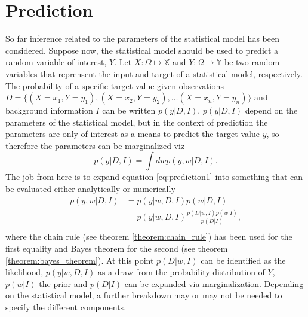 \section{Prediction}
So far inference related to the parameters of the statistical model has been considered. Suppose now, the statistical model should be used to predict a random variable of interest, $Y$. Let $X: \Omega \mapsto \mathbb{X}$ and $Y:\Omega \mapsto \mathbb{Y}$ be two random variables that reprensent the input and target of a statistical model, respectively. The probability of a specific target value given observations $D = \{(X=x_1, Y=y_1), (X=x_2, Y=y_2),\dots (X=x_n, Y=y_n)\}$ and background information $I$ can be written $p(y|D,I)$. $p(y|D,I)$ depend on the parameters of the statistical model, but in the context of prediction the parameters are only of interest as a means to predict the target value $y$, so therefore the parameters can be marginalized viz
\begin{equation}
	p(y|D,I) = \int dw p(y,w|D,I).
	\label{eq:prediction1}
\end{equation}
The job from here is to expand equation \eqref{eq:prediction1} into something that can be evaluated either analytically or numerically
\begin{equation}
	\begin{split}
	p(y,w|D,I) & = p(y|w,D,I)p(w|D,I)\\
	& = p(y|w,D,I)\frac{p(D|w,I)p(w|I)}{p(D|I)},\\
	\end{split}
	\label{eq:prediction2}
\end{equation}
where the chain rule (see theorem \ref{theorem:chain_rule}) has been used for the first equality and Bayes theorem for the second (see theorem \ref{theorem:bayes_theorem}). At this point $p(D|w,I)$ can be identified as the likelihood, $p(y|w,D,I)$ as a draw from the probability distribution of $Y$, $p(w|I)$ the prior and $p(D|I)$ can be expanded via marginalization. Depending on the statistical model, a further breakdown may or may not be needed to specify the different components.


